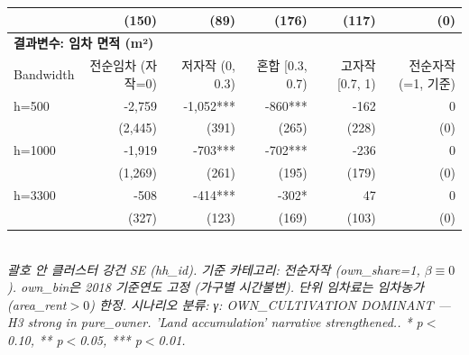 \begin{table}[t]
\begin{tabular}{lrrrrr}
    & (150) & (89) & (176) & (117) & (0) \\
\midrule
\multicolumn{6}{l}{\textbf{결과변수: 임차 면적 (m²)}} \\
Bandwidth & 전순임차 (자작=0) & 저자작 (0, 0.3) & 혼합 [0.3, 0.7) & 고자작 [0.7, 1) & 전순자작 (=1, 기준) \\
\midrule
h=500 & -2,759 & -1,052*** & -860*** & -162 & 0 \\
    & (2,445) & (391) & (265) & (228) & (0) \\
h=1000 & -1,919 & -703*** & -702*** & -236 & 0 \\
    & (1,269) & (261) & (195) & (179) & (0) \\
h=3300 & -508 & -414*** & -302* & 47 & 0 \\
    & (327) & (123) & (169) & (103) & (0) \\
\midrule
\bottomrule
\end{tabular}
\\
\footnotesize\textit{괄호 안 클러스터 강건 SE (hh\_id). 기준 카테고리: 전순자작 (own\_share=1, $\beta \equiv 0$). own\_bin은 2018 기준연도 고정 (가구별 시간불변). 단위 임차료는 임차농가 (area\_rent$>0$) 한정. 시나리오 분류: γ: OWN_CULTIVATION DOMINANT — H3 strong in pure_owner. 'Land accumulation' narrative strengthened.. * p$<$0.10, ** p$<$0.05, *** p$<$0.01.}
\end{table}

